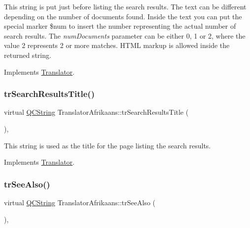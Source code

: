 This string is put just before listing the search results. The text can be different depending on the number of documents found. Inside the text you can put the special marker \$num to insert the number representing the actual number of search results. The {\itshape num\+Documents} parameter can be either 0, 1 or 2, where the value 2 represents 2 or more matches. H\+T\+ML markup is allowed inside the returned string. 

Implements \mbox{\hyperlink{class_translator}{Translator}}.

\mbox{\label{class_translator_afrikaans_a3a5ab3ad2e86eadc87f870659d30d423}} 
\subsubsection{\texorpdfstring{trSearchResultsTitle()}{trSearchResultsTitle()}}
{\footnotesize\ttfamily virtual \mbox{\hyperlink{class_q_c_string}{Q\+C\+String}} Translator\+Afrikaans\+::tr\+Search\+Results\+Title (\begin{DoxyParamCaption}{ }\end{DoxyParamCaption})\hspace{0.3cm}{\ttfamily [inline]}, {\ttfamily [virtual]}}

This string is used as the title for the page listing the search results. 

Implements \mbox{\hyperlink{class_translator}{Translator}}.

\mbox{\label{class_translator_afrikaans_a48c4636e77c377757af7a81ccf45769d}} 
\subsubsection{\texorpdfstring{trSeeAlso()}{trSeeAlso()}}
{\footnotesize\ttfamily virtual \mbox{\hyperlink{class_q_c_string}{Q\+C\+String}} Translator\+Afrikaans\+::tr\+See\+Also (\begin{DoxyParamCaption}{ }\end{DoxyParamCaption})\hspace{0.3cm}{\ttfamily [inline]}, {\ttfamily [virtual]}}

